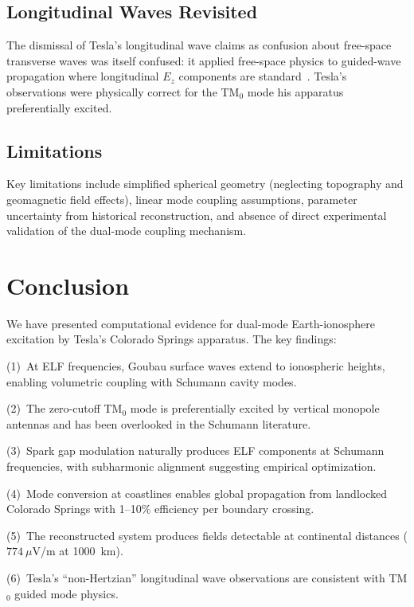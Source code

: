 \documentclass[12pt,preprint,amsmath,amssymb]{revtex4-2}
\begin{document}
\subsection{Longitudinal Waves Revisited}

The dismissal of Tesla's longitudinal wave claims as confusion about free-space transverse waves was
itself confused: it applied free-space physics to guided-wave propagation where longitudinal $E_z$
components are standard~\cite{wait1962,sommerfeld1909}. Tesla's observations were physically correct
for the TM$_0$ mode his apparatus preferentially excited.

\subsection{Limitations}

Key limitations include simplified spherical geometry (neglecting topography and geomagnetic field
effects), linear mode coupling assumptions, parameter uncertainty from historical reconstruction, and
absence of direct experimental validation of the dual-mode coupling mechanism.

\section{Conclusion}
\label{sec:conclusion}

We have presented computational evidence for dual-mode Earth-ionosphere excitation by Tesla's Colorado
Springs apparatus. The key findings:

(1)~At ELF frequencies, Goubau surface waves extend to ionospheric heights, enabling volumetric
coupling with Schumann cavity modes.

(2)~The zero-cutoff TM$_0$ mode is preferentially excited by vertical monopole antennas and has been
overlooked in the Schumann literature.

(3)~Spark gap modulation naturally produces ELF components at Schumann frequencies, with subharmonic
alignment suggesting empirical optimization.

(4)~Mode conversion at coastlines enables global propagation from landlocked Colorado Springs with
1--10\% efficiency per boundary crossing.

(5)~The reconstructed system produces fields detectable at continental distances ($774~\mu$V/m at
1000~km).

(6)~Tesla's ``non-Hertzian'' longitudinal wave observations are consistent with TM$_0$ guided mode
physics.
\end{document}
